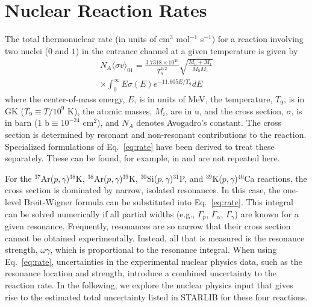 \documentclass[twocolumn]{aastex6}
\newcommand{\nuclei}[2]{$^{#1}${#2}}
\newcommand{\pgreaction}[4]{\nuclei{#1}{#2}($p,\gamma$)\nuclei{#3}{#4}}
\begin{document}
\section{Nuclear Reaction Rates} \label{sec:rates}
The total thermonuclear rate (in units of cm$^3$ mol$^{-1}$ s$^{-1}$) for a 
reaction involving two nuclei ($0$ and $1$) in the entrance channel at a given temperature is given by
\begin{equation}
\label{eq:rate}
\begin{split}
N_A\langle\sigma v \rangle_{01}=\frac{3.7318\times10^{10}}{T_9^{3/2}}\sqrt{\frac{M_0+M_1}{M_0M_1}}
\\ \times \int_{0}^\infty E \sigma(E) e^{-11.605 E/T_9} dE
\end{split}
\end{equation}
where the center-of-mass energy, $E$, is in units of MeV, the temperature, $T_9$, is in GK ($T_9 \equiv T/10^9$ K), the atomic masses, $M_i$, are in u, and the cross section, $\sigma$, is in barn ($1 \text{ b} \equiv 10^{-24}$ cm$^2$), and $N_A$ denotes Avogadro's constant. The cross section is determined by resonant and non-resonant contributions to the reaction. Specialized formulations of Eq.~\ref{eq:rate} have been derived to treat these separately. These can be found, for example, in \citet{Iliadis_Text} and are not repeated here.
\par    
For the \pgreaction{37}{Ar}{38}{K}, \pgreaction{38}{Ar}{39}{K}, \pgreaction{30}{Si}{31}{P}, and \pgreaction{39}{K}{40}{Ca} reactions, the cross section is dominated by narrow, isolated resonances. In this case, the one-level Breit-Wigner formula can be substituted into Eq.~\ref{eq:rate}. This integral can be solved numerically if all partial widths (e.g., $\Gamma_p$, $\Gamma_\alpha$, $\Gamma_\gamma$) are known for a given resonance. Frequently, resonances are so narrow that their cross section cannot be obtained experimentally. Instead, all that is measured is the resonance strength, $\omega\gamma$, which is proportional to the resonance integral.
When using Eq.~\ref{eq:rate}, uncertainties in the experimental nuclear physics data, such as the resonance location and strength, introduce a combined uncertainty to the reaction rate. 
In the following, we explore the nuclear physics input that gives rise to the estimated total uncertainty listed in STARLIB for
these four reactions.
\end{document}
